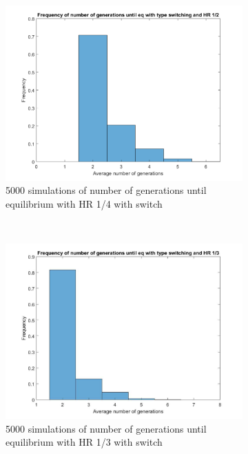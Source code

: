 \begin{figure}[H]
    \centering
    \begin{subfigure}{0.45\textwidth}
        \includegraphics[width=\textwidth]{AantGen1.pdf}
        \caption{5000 simulations of number of generations until equilibrium with HR 1/4 with switch}
        \label{hists hap 1/4}
    \end{subfigure}
	~
    \begin{subfigure}{0.45\textwidth}
        \includegraphics[width=\textwidth]{AantGen2.pdf}
        \caption{5000 simulations of number of generations until equilibrium with HR 1/3 with switch}
        \label{hists hap 1/3}
    \end{subfigure}
	~
    \begin{subfigure}{0.45\textwidth}

\end{subfigure}
\end{figure}
